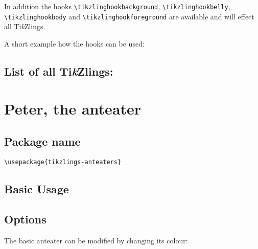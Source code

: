 \documentclass[parskip=half]{scrartcl}
\newcommand{\tikzlings}{Ti\emph{k}Zlings\xspace}
\begin{document}
In addition the hooks \lstinline|\tikzlinghookbackground|, \lstinline|\tikzlinghookbelly|, \lstinline|\tikzlinghookbody| and \lstinline|\tikzlinghookforeground| are available and will effect all \tikzlings.

A short example how the hooks can be used:
\begin{tcblisting}{}
\newcommand{\mousehookbelly}{%
 \fill[red!80!black] 
(0.55, 1.35) -- (0.65, 0.3) -- 
(-0.65, 0.3) -- (-0.55, 1.35) 
-- (0.0, 0.9) -- cycle;
}
\mouse
\end{tcblisting}

\subsection*{List of all \tikzlings:}

\begingroup
  \hypersetup{hidelinks}
  \tableofcontents
\endgroup

%
%
\clearpage
\section[Anteater]{Peter, the anteater}

\subsection{Package name}

\begin{tcolorbox}[lower separated=false, lefthand width=.8\linewidth]
\vspace*{0.5cm}
\lstinline|\usepackage{tikzlings-anteaters}| 
\vspace*{0.5cm}
\end{tcolorbox}

\subsection{Basic Usage}

\begin{tcblisting}{}
\anteater
\end{tcblisting}

\subsection{Options}

The basic anteater can be modified by changing its colour:
\begin{tcblisting}{}
\anteater[body=blue]
\end{tcblisting}
\end{document}
